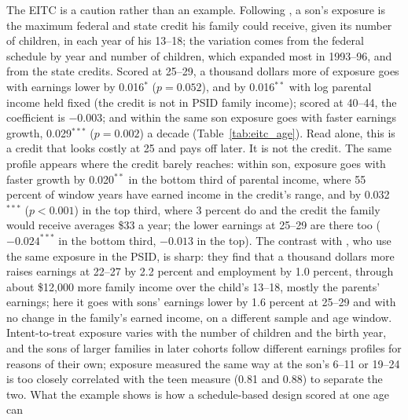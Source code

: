 The EITC is a caution rather than an example. Following \citet{bastian2018long}, a son's exposure is the maximum
federal and state credit his family could receive, given its number of children, in each year of his 13--18; the
variation comes from the federal schedule by year and number of children, which expanded most in 1993--96, and from the
state credits. Scored at 25--29, a thousand dollars more of exposure goes with earnings lower by 0.016$^{*}$
($p = 0.052$), and by 0.016$^{**}$ with log parental income held fixed (the credit is not in PSID family income); scored
at 40--44, the coefficient is $-0.003$; and within the same son exposure goes with faster earnings growth,
0.029$^{***}$ ($p = 0.002$) a decade (Table~\ref{tab:eitc_age}). Read alone, this is a credit that looks costly at 25
and pays off later. It is not the credit. The same profile appears where the credit barely reaches: within son,
exposure goes with faster growth by 0.020$^{**}$ in the bottom third of parental income, where 55 percent of window
years have earned income in the credit's range, and by 0.032$^{***}$ ($p<0.001$) in the top third, where 3 percent do
and the credit the family would receive averages \$33 a year; the lower earnings at 25--29 are there too
($-0.024^{***}$ in the bottom third, $-0.013$ in the top). The contrast with \citet{bastian2018long}, who use the
same exposure in the PSID, is sharp: they find that a thousand dollars more raises earnings at 22--27 by 2.2
percent and employment by 1.0 percent, through about \$12,000 more family income over the child's 13--18, mostly
the parents' earnings; here it goes with sons' earnings lower by 1.6 percent at 25--29 and with no change in the
family's earned income, on a different sample and age window. Intent-to-treat exposure varies with the number of children
and the birth year, and the sons of larger families in later cohorts follow different earnings profiles for reasons of
their own; exposure measured the same way at the son's 6--11 or 19--24 is too closely correlated with the teen measure
(0.81 and 0.88) to separate the two. What the example shows is how a schedule-based design scored at one age can
